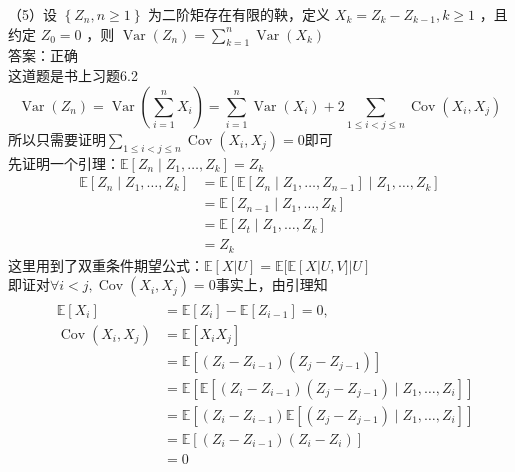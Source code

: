 \documentclass[UTF8,openany]{book}
\begin{document}
\noindent （5）设 $\left\{Z_{n}, n \geq 1\right\}$ 为二阶矩存在有限的鞅，定义 $X_{k}=Z_{k}-Z_{k-1}, k \geq 1$ ，且约定 $Z_{0}=0$ ，则 $\operatorname{Var}\left(Z_{n}\right)=\sum_{k=1}^{n} \operatorname{Var}\left(X_{k}\right)$ \\
答案：正确\\
这道题是书上习题6.2\\
\[
\operatorname{Var}\left(Z_n \right)=\operatorname{Var}(\sum_{i=1}^{n} X_i)=\sum_{i=1}^{n} \operatorname{Var}(X_i)+2\sum\limits_{1 \le i <j \le n }^{} \operatorname{Cov}(X_i,X_j) 
\]
所以只需要证明$\sum\limits_{1 \le i <j \le n }^{} \operatorname{Cov}(X_i,X_j)=0 $即可\\
先证明一个引理：$\mathbb{E}\left[Z_n \mid Z_1, \ldots, Z_k\right] =Z_k$\\
$$
\begin{aligned}
	\mathbb{E}\left[Z_n \mid Z_1, \ldots, Z_k\right] & =\mathbb{E}\left[\mathbb{E}\left[Z_n \mid Z_1, \ldots, Z_{n-1}\right] \mid Z_1, \ldots, Z_k\right] \\
	& =\mathbb{E}\left[Z_{n-1} \mid Z_1, \ldots, Z_k\right] \\
	& =\mathbb{E}\left[Z_t \mid Z_1, \ldots, Z_k\right] \\
	& =Z_k
\end{aligned}
$$
这里用到了双重条件期望公式：$\mathbb{E}[X|U]=\mathbb{E}[\mathbb{E}[X|U,V]|U]$\\
即证对$\forall i<j, \operatorname{Cov}\left(X_i, X_j\right)=0 $事实上，由引理知\\
$$
\begin{aligned}
	&\begin{aligned}
		\mathbb{E}\left[X_i\right] & =\mathbb{E}\left[Z_i\right]-\mathbb{E}\left[Z_{i-1}\right]=0, \\
		\operatorname{Cov}\left(X_i, X_j\right) & =\mathbb{E}\left[X_i X_j\right] \\
		& =\mathbb{E}\left[\left(Z_i-Z_{i-1}\right)\left(Z_j-Z_{j-1}\right)\right] \\
		& =\mathbb{E}\left[\mathbb{E}\left[\left(Z_i-Z_{i-1}\right)\left(Z_j-Z_{j-1}\right) \mid Z_1, \ldots, Z_i\right]\right] \\
		& =\mathbb{E}\left[\left(Z_i-Z_{i-1}\right) \mathbb{E}\left[\left(Z_j-Z_{j-1}\right) \mid Z_1, \ldots, Z_i\right]\right] \\
		& =\mathbb{E}\left[\left(Z_i-Z_{i-1}\right)\left(Z_i-Z_i\right)\right] \\
		& =0
	\end{aligned}
\end{aligned}
$$\\
\end{document}
